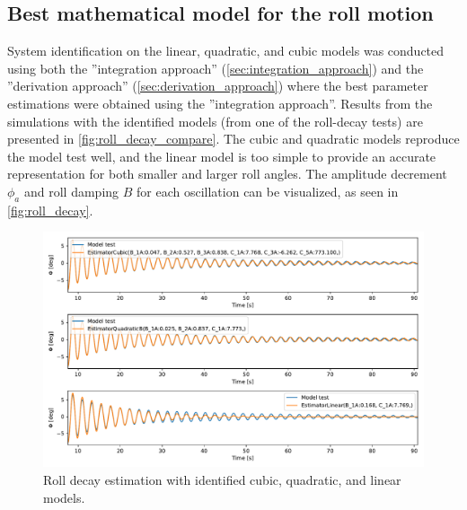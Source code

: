 \subsection{Best mathematical model for the roll motion}
System identification on the linear, quadratic, and cubic models was conducted using both the ''integration approach'' (\autoref{sec:integration_approach}) and the ''derivation approach'' (\autoref{sec:derivation_approach}) where the best parameter estimations were obtained using the ''integration approach''.
Results from the simulations with the identified models (from one of the roll-decay tests) are presented in \autoref{fig:roll_decay_compare}. The cubic and quadratic models reproduce the model test well, and the linear model is too simple to provide an accurate representation for both smaller and larger roll angles. The amplitude decrement $\phi_a$ and roll damping $B$ for each oscillation can be visualized, as seen in \autoref{fig:roll_decay}.

\begin{figure}[!htb]
    \centering
    \includegraphics[width=\linewidth]{kappa/images/roll_decay_model_compare.pdf}
    \caption{Roll decay estimation with identified cubic, quadratic, and linear models.}
    \label{fig:roll_decay_compare}
\end{figure}

